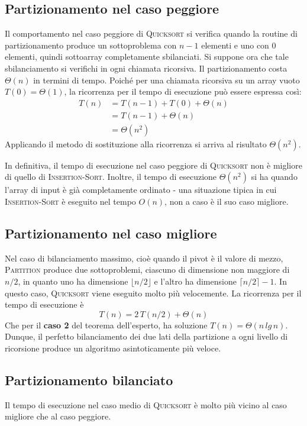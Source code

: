 \documentclass[10pt, a4paper]{report}
\begin{document}
\subsection{Partizionamento nel caso peggiore}
Il comportamento nel caso peggiore di \textsc{Quicksort} si verifica quando la routine di partizionamento produce un sottoproblema con $n - 1$ elementi e uno con $0$ elementi, quindi sottoarray completamente sbilanciati. Si suppone ora che tale sbilanciamento si verifichi in ogni chiamata ricorsiva. Il partizionamento costa $\Theta(n)$ in termini di tempo. Poiché per una chiamata ricorsiva su un array vuoto $T(0) = \Theta(1)$, la ricorrenza per il tempo di esecuzione può essere espressa così:
\begin{align*}
T(n) &= T(n -1) + T(0) + \Theta(n) \\
&= T(n - 1) + \Theta(n) \\
&= \Theta(n^2)
\end{align*}
Applicando il metodo di sostituzione alla ricorrenza si arriva al risultato $\Theta(n^2)$.

In definitiva, il tempo di esecuzione nel caso peggiore di \textsc{Quicksort} non è migliore di quello di \textsc{Insertion-Sort}. Inoltre, il tempo di esecuzione $\Theta(n^2)$ si ha quando l'array di input è già completamente ordinato - una situazione tipica in cui \textsc{Insertion-Sort} è eseguito nel tempo $O(n)$, non a caso è il suo caso migliore.
\subsection{Partizionamento nel caso migliore}
Nel caso di bilanciamento massimo, cioè quando il pivot è il valore di mezzo, \textsc{Partition} produce due sottoproblemi, ciascuno di dimensione non maggiore di $n/2$, in quanto uno ha dimensione $\lfloor n/2 \rfloor$ e l'altro ha dimensione $\lceil n/2 \rceil - 1$. In questo caso, \textsc{Quicksort} viene eseguito molto più velocemente. La ricorrenza per il tempo di esecuzione è
\begin{equation*}
T(n) = 2\,T(n/2) + \Theta(n)
\end{equation*}
Che per il \textbf{caso 2} del teorema dell'esperto, ha soluzione $T(n) = \Theta(n\,lg\,n)$. Dunque, il perfetto bilanciamento dei due lati della partizione a ogni livello di ricorsione produce un algoritmo asintoticamente più veloce.
\subsection{Partizionamento bilanciato}
Il tempo di esecuzione nel caso medio di \textsc{Quicksort} è molto più vicino al caso migliore che al caso peggiore.
\end{document}
